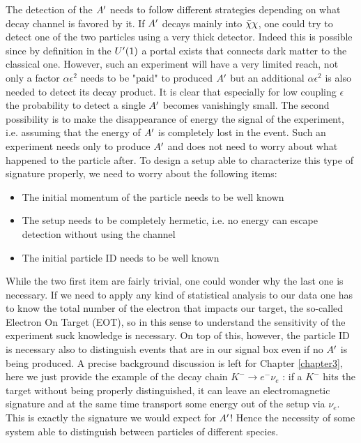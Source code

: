 The detection of the $A'$ needs to follow different strategies depending on what decay channel is favored by it. If $A'$ decays mainly into $\bar{\chi} \chi$, one could try to detect one of the two particles using a very thick detector. Indeed this is possible since by definition in the $U'(1)$ a portal exists that connects dark matter to the classical one. However, such an experiment will have a very limited reach, not only a factor $\alpha \epsilon^2$ needs to be "paid" to produced $A'$ but an additional $\alpha \epsilon^2$ is also needed to detect its decay product. It is clear that especially for low coupling $\epsilon$ the probability to detect a single $A'$ becomes vanishingly small. The second possibility is to make the disappearance of energy the signal of the experiment, i.e. assuming that the energy of $A'$ is completely lost in the event. Such an experiment needs only to produce $A'$ and does not need to worry about what happened to the particle after. To design a setup able to characterize this type of signature properly, we need to worry about the following items:

\begin{itemize}
\item The initial momentum of the particle needs to be well known
\item The setup needs to be completely hermetic, i.e. no energy can escape detection without using the channel 
\item The initial particle ID needs to be well known
\end{itemize}

While the two first item are fairly trivial, one could wonder why the last one is necessary. If we need to apply any kind of statistical analysis to our data one has to know the total number of the electron that impacts our target, the so-called Electron On Target (EOT), so in this sense to understand the sensitivity of the experiment suck knowledge is necessary. On top of this, however, the particle ID is necessary also to distinguish events that are in our signal box even if no $A'$ is being produced. A precise background discussion is left for Chapter \ref{chapter3}, here we just provide the example of the decay chain $K^- \to e^- \nu_e$ \cite{review-particle-physics}: if a $K^-$ hits the target without being properly distinguished, it can leave an electromagnetic signature and at the same time transport some energy out of the setup via $\nu_e$. This is exactly the signature we would expect for $A'$! Hence the necessity of some system able to distinguish between particles of different species.

